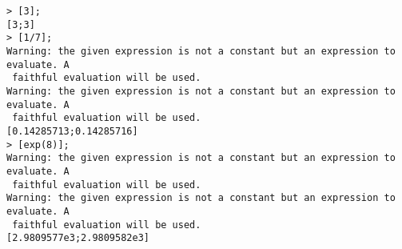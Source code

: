 \begin{center}\begin{minipage}{15cm}\begin{Verbatim}[frame=single]
> [3];
[3;3]
> [1/7];
Warning: the given expression is not a constant but an expression to evaluate. A
 faithful evaluation will be used.
Warning: the given expression is not a constant but an expression to evaluate. A
 faithful evaluation will be used.
[0.14285713;0.14285716]
> [exp(8)];
Warning: the given expression is not a constant but an expression to evaluate. A
 faithful evaluation will be used.
Warning: the given expression is not a constant but an expression to evaluate. A
 faithful evaluation will be used.
[2.9809577e3;2.9809582e3]
\end{Verbatim}
\end{minipage}\end{center}
